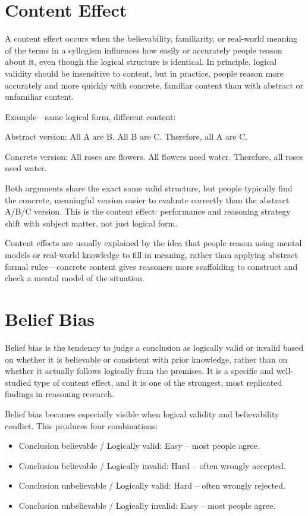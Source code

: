 \documentclass[11pt]{article}
\begin{document}
\section{Content Effect}

A content effect occurs when the believability, familiarity, or real-world meaning of the terms in a syllogism influences how easily or accurately people reason about it, even though the logical structure is identical. In principle, logical validity should be insensitive to content, but in practice, people reason more accurately and more quickly with concrete, familiar content than with abstract or unfamiliar content.

Example---same logical form, different content:

Abstract version:
All A are B. All B are C. Therefore, all A are C.

Concrete version:
All roses are flowers. All flowers need water. Therefore, all roses need water.

Both arguments share the exact same valid structure, but people typically find the concrete, meaningful version easier to evaluate correctly than the abstract A/B/C version. This is the content effect: performance and reasoning strategy shift with subject matter, not just logical form.

Content effects are usually explained by the idea that people reason using mental models or real-world knowledge to fill in meaning, rather than applying abstract formal rules---concrete content gives reasoners more scaffolding to construct and check a mental model of the situation.

\section{Belief Bias}

Belief bias is the tendency to judge a conclusion as logically valid or invalid based on whether it is believable or consistent with prior knowledge, rather than on whether it actually follows logically from the premises. It is a specific and well-studied type of content effect, and it is one of the strongest, most replicated findings in reasoning research.

Belief bias becomes especially visible when logical validity and believability conflict. This produces four combinations:

\begin{itemize}
	\item Conclusion believable / Logically valid: Easy -- most people agree.
	\item Conclusion believable / Logically invalid: Hard -- often wrongly accepted.
	\item Conclusion unbelievable / Logically valid: Hard -- often wrongly rejected.
	\item Conclusion unbelievable / Logically invalid: Easy -- most people agree.
\end{itemize}
\end{document}
